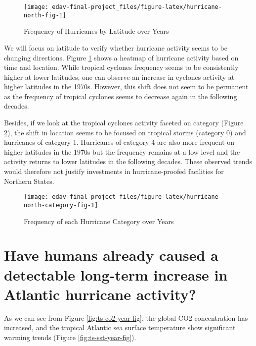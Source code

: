 \documentclass[]{book}
\begin{document}
\begin{figure}

{\centering \texttt{[image: edav-final-project\_files/figure-latex/hurricane-north-fig-1]} 

}

\caption{Frequency of Hurricanes by Latitude over Years}\label{fig:hurricane-north-fig}
\end{figure}

We will focus on latitude to verify whether hurricane activity seems to be changing directions. Figure \ref{fig:hurricane-north-fig} shows a heatmap of hurricane activity based on time and location. While tropical cyclones frequency seems to be consistently higher at lower latitudes, one can observe an increase in cyclones activity at higher latitudes in the 1970s. However, this shift does not seem to be permanent as the frequency of tropical cyclones seems to decrease again in the following decades.

Besides, if we look at the tropical cyclones activity faceted on category (Figure \ref{fig:hurricane-north-category-fig}), the shift in location seems to be focused on tropical storms (category 0) and hurricanes of category 1. Hurricanes of category 4 are also more frequent on higher latitudes in the 1970s but the frequency remains at a low level and the activity returns to lower latitudes in the following decades. These observed trends would therefore not justify investments in hurricane-proofed facilities for Northern States.

\begin{figure}

{\centering \texttt{[image: edav-final-project\_files/figure-latex/hurricane-north-category-fig-1]} 

}

\caption{Frequency of each Hurricane Category over Years}\label{fig:hurricane-north-category-fig}
\end{figure}

\hypertarget{have-humans-already-caused-a-detectable-long-term-increase-in-atlantic-hurricane-activity}{%
\section{Have humans already caused a detectable long-term increase in Atlantic hurricane activity?}\label{have-humans-already-caused-a-detectable-long-term-increase-in-atlantic-hurricane-activity}}

As we can see from Figure \ref{fig:ts-co2-year-fig}, the global CO2 concentration has increased, and the tropical Atlantic sea surface temperature show significant warming trends (Figure \ref{fig:ts-sst-year-fig}).
\end{document}
